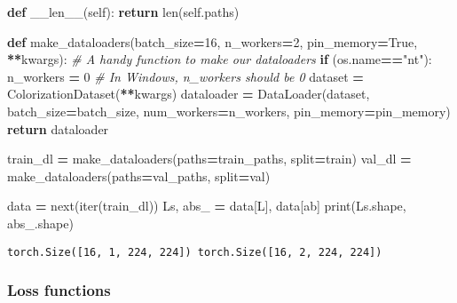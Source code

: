\documentclass[
]{article}
\newenvironment{Shaded}{\begin{snugshade}}{\end{snugshade}}
\newcommand{\BuiltInTok}[1]{#1}
\newcommand{\CommentTok}[1]{\textcolor[rgb]{0.56,0.35,0.01}{\textit{#1}}}
\newcommand{\ControlFlowTok}[1]{\textcolor[rgb]{0.13,0.29,0.53}{\textbf{#1}}}
\newcommand{\DecValTok}[1]{\textcolor[rgb]{0.00,0.00,0.81}{#1}}
\newcommand{\FunctionTok}[1]{\textcolor[rgb]{0.00,0.00,0.00}{#1}}
\newcommand{\KeywordTok}[1]{\textcolor[rgb]{0.13,0.29,0.53}{\textbf{#1}}}
\newcommand{\NormalTok}[1]{#1}
\newcommand{\OperatorTok}[1]{\textcolor[rgb]{0.81,0.36,0.00}{\textbf{#1}}}
\newcommand{\StringTok}[1]{\textcolor[rgb]{0.31,0.60,0.02}{#1}}
\newcommand{\VariableTok}[1]{\textcolor[rgb]{0.00,0.00,0.00}{#1}}
\begin{document}
\begin{Shaded}
\begin{Highlighting}[]
    \KeywordTok{def} \FunctionTok{\_\_len\_\_}\NormalTok{(}\VariableTok{self}\NormalTok{):}
        \ControlFlowTok{return} \BuiltInTok{len}\NormalTok{(}\VariableTok{self}\NormalTok{.paths)}

\KeywordTok{def}\NormalTok{ make\_dataloaders(batch\_size}\OperatorTok{=}\DecValTok{16}\NormalTok{, n\_workers}\OperatorTok{=}\DecValTok{2}\NormalTok{, pin\_memory}\OperatorTok{=}\VariableTok{True}\NormalTok{, }\OperatorTok{**}\NormalTok{kwargs): }\CommentTok{\# A handy function to make our dataloaders}
    \ControlFlowTok{if}\NormalTok{ (os.name}\OperatorTok{==}\StringTok{"nt"}\NormalTok{):}
\NormalTok{        n\_workers }\OperatorTok{=} \DecValTok{0}  \CommentTok{\# In Windows, n\_workers should be 0}
\NormalTok{    dataset }\OperatorTok{=}\NormalTok{ ColorizationDataset(}\OperatorTok{**}\NormalTok{kwargs)}
\NormalTok{    dataloader }\OperatorTok{=}\NormalTok{ DataLoader(dataset, batch\_size}\OperatorTok{=}\NormalTok{batch\_size, num\_workers}\OperatorTok{=}\NormalTok{n\_workers,}
\NormalTok{                            pin\_memory}\OperatorTok{=}\NormalTok{pin\_memory)}
    \ControlFlowTok{return}\NormalTok{ dataloader}
\end{Highlighting}
\end{Shaded}

\begin{Shaded}
\begin{Highlighting}[]
\NormalTok{train\_dl }\OperatorTok{=}\NormalTok{ make\_dataloaders(paths}\OperatorTok{=}\NormalTok{train\_paths, split}\OperatorTok{=}\StringTok{\textquotesingle{}train\textquotesingle{}}\NormalTok{)}
\NormalTok{val\_dl }\OperatorTok{=}\NormalTok{ make\_dataloaders(paths}\OperatorTok{=}\NormalTok{val\_paths, split}\OperatorTok{=}\StringTok{\textquotesingle{}val\textquotesingle{}}\NormalTok{)}

\NormalTok{data }\OperatorTok{=} \BuiltInTok{next}\NormalTok{(}\BuiltInTok{iter}\NormalTok{(train\_dl))}
\NormalTok{Ls, abs\_ }\OperatorTok{=}\NormalTok{ data[}\StringTok{\textquotesingle{}L\textquotesingle{}}\NormalTok{], data[}\StringTok{\textquotesingle{}ab\textquotesingle{}}\NormalTok{]}
\BuiltInTok{print}\NormalTok{(Ls.shape, abs\_.shape)}
\end{Highlighting}
\end{Shaded}

\begin{verbatim}
torch.Size([16, 1, 224, 224]) torch.Size([16, 2, 224, 224])
\end{verbatim}

\hypertarget{loss-functions}{%
\subsubsection{Loss functions}\label{loss-functions}}
\end{document}

